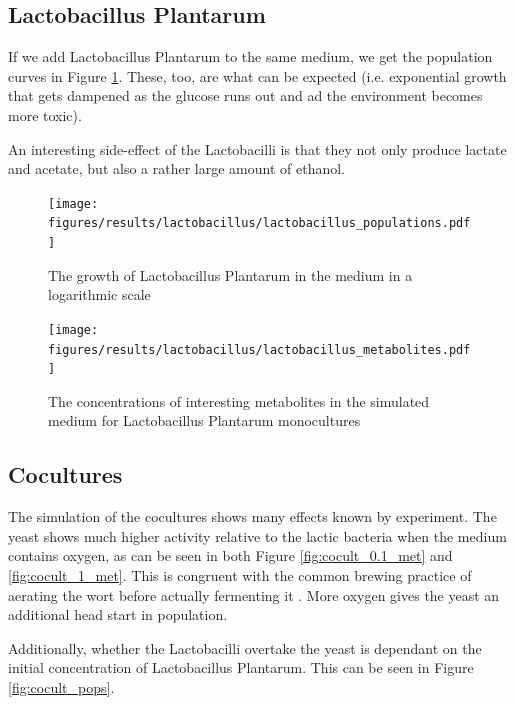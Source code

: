 	\subsection{Lactobacillus Plantarum}
		If we add Lactobacillus Plantarum to the same medium, we get the population curves in Figure \ref{fig:lb_pop}.
		These, too, are what can be expected (i.e. exponential growth that gets dampened as the glucose runs out and ad the environment becomes more toxic).
		
		An interesting side-effect of the Lactobacilli is that they not only produce lactate and acetate, but also a rather large amount of ethanol.
		\begin{figure}[h]
			\centering
			\texttt{[image: figures/results/lactobacillus/lactobacillus\_populations.pdf]}
			\caption{The growth of Lactobacillus Plantarum in the medium in a logarithmic scale}
			\label{fig:lb_pop}
		\end{figure}
		
		\begin{figure}[h]
			\centering
			\texttt{[image: figures/results/lactobacillus/lactobacillus\_metabolites.pdf]}
			\caption{The concentrations of interesting metabolites in the simulated medium for Lactobacillus Plantarum monocultures}
			\label{fig:lb_met}
		\end{figure}
	
	\subsection{Cocultures}
		The simulation of the cocultures shows many effects known by experiment.
		The yeast shows much higher activity relative to the lactic bacteria when the medium contains oxygen, as can be seen in both Figure \ref{fig:cocult_0.1_met} and \ref{fig:cocult_1_met}.
		This is congruent with the common brewing practice of aerating the wort before actually fermenting it \cite[P. 168]{daniels1996designing}.
		More oxygen gives the yeast an additional head start in population.
		
		Additionally, whether the Lactobacilli overtake the yeast is dependant on the initial concentration of Lactobacillus Plantarum.
		This can be seen in Figure \ref{fig:cocult_pops}.
		
